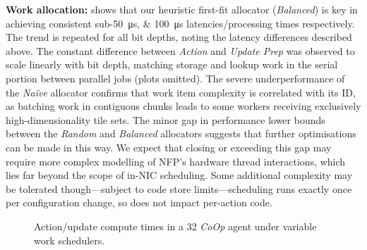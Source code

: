 \documentclass[sigconf,natbib=false]{acmart}
\newcommand{\fakepara}[1]{\noindent\textbf{#1:}}
\newcommand{\Coopfw}{\emph{CoOp}}
\begin{document}
\fakepara{Work allocation}
 shows that our heuristic first-fit allocator (\emph{Balanced}) is key in achieving consistent sub-\SIlist{50;100}{\micro\second} latencies/processing times respectively.
The trend is repeated for all bit depths, noting the latency differences described above.
The constant difference between \emph{Action} and \emph{Update Prep} was observed to scale linearly with bit depth, matching storage and lookup work in the serial portion between parallel jobs (plots omitted).
The severe underperformance of the \emph{Na\"{i}ve} allocator confirms that work item complexity is correlated with its ID, as batching work in contiguous chunks leads to some workers receiving exclusively high-dimensionality tile sets.
The minor gap in performance lower bounds between the \emph{Random} and \emph{Balanced} allocators suggests that further optimisations can be made in this way.
We expect that closing or exceeding this gap may require more complex modelling of NFP's hardware thread interactions, which lies far beyond the scope of in-NIC scheduling.
Some additional complexity may be tolerated though---subject to code store limits---scheduling runs exactly once per configuration change, so does not impact per-action code.

\begin{figure}
	\caption{Action/update compute times in a \SI{32}{\bit} \Coopfw{} agent under variable work schedulers.\label{fig:work-alloc-32}}
\end{figure}
\end{document}

